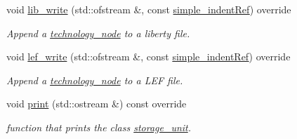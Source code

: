 \begin{DoxyCompactItemize}
void \hyperlink{structstorage__unit_ad2c076de79995410b591bf3102c47cc1}{lib\+\_\+write} (std\+::ofstream \&, const \hyperlink{simple__indent_8hpp_ad85cff64e49d5dbf5cefe96f411c720e}{simple\+\_\+indent\+Ref}) override
\begin{DoxyCompactList}\small\item\em Append a \hyperlink{structtechnology__node}{technology\+\_\+node} to a liberty file. \end{DoxyCompactList}\item 
void \hyperlink{structstorage__unit_a444c9109c8a40618702dba1fa86b05dc}{lef\+\_\+write} (std\+::ofstream \&, const \hyperlink{simple__indent_8hpp_ad85cff64e49d5dbf5cefe96f411c720e}{simple\+\_\+indent\+Ref}) override
\begin{DoxyCompactList}\small\item\em Append a \hyperlink{structtechnology__node}{technology\+\_\+node} to a L\+EF file. \end{DoxyCompactList}\item 
void \hyperlink{structstorage__unit_a8c2a91597aa05ac41cd71a5df907fd8f}{print} (std\+::ostream \&) const override
\begin{DoxyCompactList}\small\item\em function that prints the class \hyperlink{structstorage__unit}{storage\+\_\+unit}. \end{DoxyCompactList}\end{DoxyCompactItemize}
